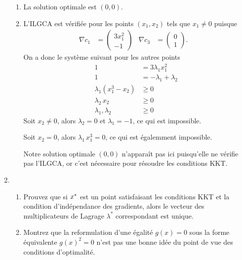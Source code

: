 \begin{enumerate}
  \begin{solution}
    \begin{enumerate}
      \item La solution optimale est $(0,0)$.
      \item L'ILGCA est vérifiée pour les points $(x_1,x_2)$ 
      tels que $x_1 \neq 0$ puisque
      \begin{align*}
        \nabla c_1 &= \begin{pmatrix} 3x_1^2 \\ -1 \end{pmatrix} &
        \nabla c_3 &= \begin{pmatrix} 0 \\ 1 \end{pmatrix}. &
      \end{align*}
      On a donc le système suivant pour les autres points 
      \begin{align*}
        1 &= 3 \lambda_1 x_1^2 \\
        1 &= -\lambda_1 + \lambda_2 \\
        \lambda_1 (x_1^3-x_2) &\geq 0 \\
        \lambda_2 \, x_2 &\geq 0 \\
        \lambda_1 , \lambda_2 &\geq 0
      \end{align*}
      Soit $x_2 \neq 0$, alors $\lambda_2 = 0$ et $\lambda_1 = -1$,
      ce qui est impossible.
      
      Soit $x_2 = 0$, alors $\lambda_1 \, x_1^3 = 0$,
      ce qui est égalemment impossible.
      
      Notre solution optimale $(0,0)$ n'appara\^it pas ici puisqu'elle ne vérifie
      pas l'ILGCA, or c'est nécessaire pour résoudre les conditions KKT.
    \end{enumerate}
  \end{solution}
  
  \item 
  \begin{enumerate}
    \item Prouvez que si $x^*$ est un point satisfaisant les conditions KKT
    et la condition d'indépendance des gradients, alors le vecteur des 
    multiplicateurs de Lagrage $\lambda^*$ correspondant est unique.
    \item Montrez que la reformulation d'une égalité $g(x)=0$ sous la forme
    équivalente $g(x)^2=0$ n'est pas une bonne idée du point de vue des 
    conditions d'optimalité.
  \end{enumerate}
  

\end{enumerate}
